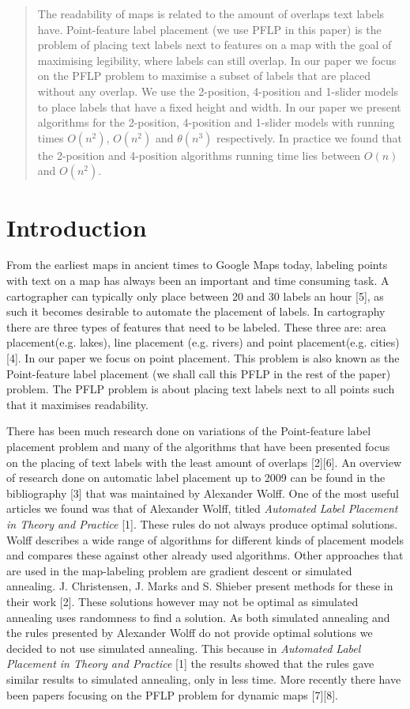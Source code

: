 \documentclass[crop=false,a4paper,oneside,11pt]{standalone}
\begin{document}
\begin{abstract}
The readability of maps is related to the amount of overlaps text labels have. Point-feature label placement (we use PFLP in this paper) is the problem of placing text labels next to features on a map with the goal of maximising legibility, where labels can still overlap. In our paper we focus on the PFLP problem to maximise a subset of labels that are placed without any overlap. We use the 2-position, 4-position and 1-slider models to place labels that have a fixed height and width. In our paper we present algorithms for the 2-position, 4-position and 1-slider models with running times $O(n^2)$, $O(n^2)$ and $\theta(n^3)$ respectively. In practice we found that the 2-position and 4-position algorithms running time lies between $O(n)$ and $O(n^2)$.
\end{abstract}

\section{Introduction}
From the earliest maps in ancient times to Google Maps today, labeling points with text on a map has always been an important and time consuming task. A cartographer can typically only place between 20 and 30 labels an hour [5], as such it becomes desirable to automate the placement of labels. In cartography there are three types of features that need to be labeled. These three are: area placement(e.g. lakes), line placement (e.g. rivers) and point placement(e.g. cities) [4]. In our paper we focus on point placement. This problem is also known as the Point-feature label placement (we shall call this PFLP in the rest of the paper) problem. The PFLP problem is about placing text labels next to all points such that it maximises readability.

 There has been much research done on variations of the Point-feature label placement problem and many of the algorithms that have been presented focus on the placing of text labels with the least amount of overlaps [2][6]. An overview of research done on automatic label placement up to 2009 can be found in the bibliography [3] that was maintained by Alexander Wolff. One of the most useful articles we found was that of Alexander Wolff, titled \emph{Automated Label Placement in Theory and Practice} [1]. These rules do not always produce optimal solutions. Wolff describes a wide range of algorithms for different kinds of placement models and compares these against other already used algorithms. Other approaches that are used in the map-labeling problem are gradient descent or simulated annealing. J. Christensen, J. Marks and S. Shieber present methods for these in their work [2]. These solutions however may not be optimal as simulated annealing uses randomness to find a solution. As both simulated annealing and the rules presented by Alexander Wolff do not provide optimal solutions we decided to not use simulated annealing. This because in \emph{Automated Label Placement in Theory and Practice} [1] the results showed that the rules gave similar results to simulated annealing, only in less time.  More recently there have been papers focusing on the PFLP problem for dynamic maps [7][8].
\end{document}
